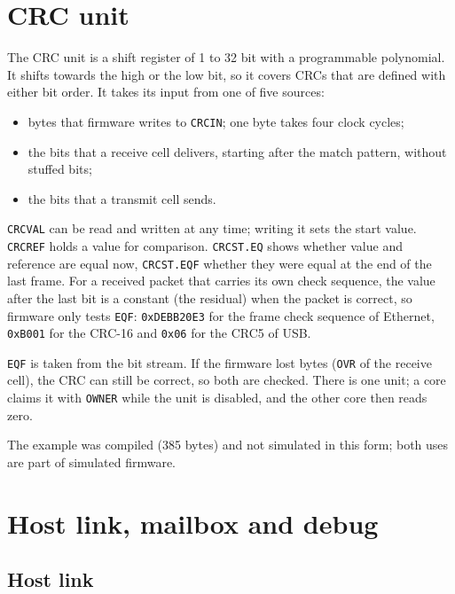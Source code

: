 \documentclass[10pt,a4paper]{article}
\newcommand{\reg}[1]{\texttt{#1}}
\begin{document}
\section{CRC unit}\label{sec:crc}

The CRC unit is a shift register of 1 to 32 bit with a programmable polynomial. It shifts towards the high or
the low bit, so it covers CRCs that are defined with either bit order. It takes its input from one of five
sources:

\begin{itemize}
\item bytes that firmware writes to \reg{CRCIN}; one byte takes four clock cycles;
\item the bits that a receive cell delivers, starting after the match pattern, without stuffed bits;
\item the bits that a transmit cell sends.
\end{itemize}

\reg{CRCVAL} can be read and written at any time; writing it sets the start value. \reg{CRCREF} holds a value
for comparison. \reg{CRCST.EQ} shows whether value and reference are equal now, \reg{CRCST.EQF} whether they were
equal at the end of the last frame. For a received packet that carries its own check sequence, the value after
the last bit is a constant (the residual) when the packet is correct, so firmware only tests \reg{EQF}:
\texttt{0xDEBB20E3} for the frame check sequence of Ethernet, \texttt{0xB001} for the CRC-16 and \texttt{0x06} for
the CRC5 of USB.

\reg{EQF} is taken from the bit stream. If the firmware lost bytes (\reg{OVR} of the receive cell), the CRC can
still be correct, so both are checked. There is one unit; a core claims it with \reg{OWNER} while the unit is
disabled, and the other core then reads zero.



The example was compiled (385 bytes) and not simulated in this form; both uses are part of simulated firmware.



\section{Host link, mailbox and debug}\label{sec:host}

\subsection{Host link}
\end{document}
